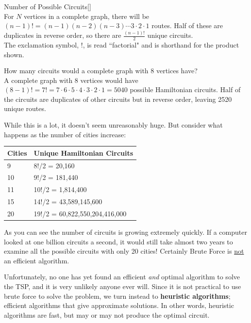 \begin{theorem}{Number of Possible Circuits}{}[]
\hspace{1in}\\
For $N$ vertices in a complete graph, there will be $(n-1)!=(n-1)(n-2)(n-3)\cdots 3\cdot 2\cdot 1$ routes.  Half of these are duplicates in reverse order, so there are $\frac{(n-1)!}{2}$ unique circuits.\\

\noindent The exclamation symbol, $!$,  is read ``factorial" and is shorthand for the product shown.
\end{theorem}

\begin{example}{}{} %
How many circuits would a complete graph with 8 vertices have?\\

A complete graph with 8 vertices would have $(8-1)!=7!=7\cdot 6 \cdot 5\cdot 4\cdot 3\cdot 2\cdot 1 = 5040$ possible Hamiltonian circuits.  Half of the circuits are duplicates of other circuits but in reverse order, leaving 2520 unique routes.  
\end{example}


While this is a lot, it doesn't seem unreasonably huge.  But consider what happens as the number of cities increase:
\begin{center}
\begin{tabular}{|l|l|}
\hline
Cities &Unique Hamiltonian Circuits\\
\hline
9&8!/2 = 20,160\\
\hline
10&9!/2 = 181,440\\
\hline
11&10!/2 = 1,814,400\\
\hline
15 &14!/2 = 43,589,145,600\\
\hline
20&19!/2 = 60,822,550,204,416,000\\
\hline
\end{tabular}
\end{center}

As you can see the number of circuits is growing extremely quickly.  If a computer looked at one billion circuits a second, it would still take almost two years to examine all the possible circuits with only 20 cities!  Certainly Brute Force is \underline{not} an efficient algorithm.  


Unfortunately, no one has yet found an efficient \textit{and} optimal algorithm to solve the TSP, and it is very unlikely anyone ever will.  Since it is not practical to use brute force to solve the problem, we turn instead to \textbf{heuristic algorithms}; efficient algorithms that give approximate solutions.  In other words, heuristic algorithms are fast, but may or may not produce the optimal circuit.

